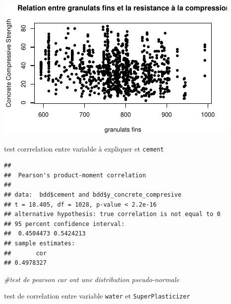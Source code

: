 \documentclass[
  12pt,
]{article}
\newenvironment{Shaded}{\begin{snugshade}}{\end{snugshade}}
\newcommand{\AttributeTok}[1]{\textcolor[rgb]{0.13,0.29,0.53}{#1}}
\newcommand{\CommentTok}[1]{\textcolor[rgb]{0.56,0.35,0.01}{\textit{#1}}}
\newcommand{\FunctionTok}[1]{\textcolor[rgb]{0.13,0.29,0.53}{\textbf{#1}}}
\newcommand{\NormalTok}[1]{#1}
\newcommand{\SpecialCharTok}[1]{\textcolor[rgb]{0.81,0.36,0.00}{\textbf{#1}}}
\newcommand{\StringTok}[1]{\textcolor[rgb]{0.31,0.60,0.02}{#1}}
\begin{document}
\begin{center}\includegraphics{rmd_final_files/figure-latex/unnamed-chunk-24-1} \end{center}

test corrrelation entre variable à expliquer et \texttt{cement}

\begin{Shaded}
\end{Shaded}

\begin{verbatim}
## 
##  Pearson's product-moment correlation
## 
## data:  bdd$cement and bdd$y_concrete_compresive
## t = 18.405, df = 1028, p-value < 2.2e-16
## alternative hypothesis: true correlation is not equal to 0
## 95 percent confidence interval:
##  0.4504473 0.5424213
## sample estimates:
##       cor 
## 0.4978327
\end{verbatim}

\begin{Shaded}
\begin{Highlighting}[]
\CommentTok{\#test de pearson car ont une distribution pseudo{-}normale}
\end{Highlighting}
\end{Shaded}

test de correlation entre variable \texttt{water} et
\texttt{SuperPlasticizer}

\begin{Shaded}
\end{Shaded}
\end{document}
